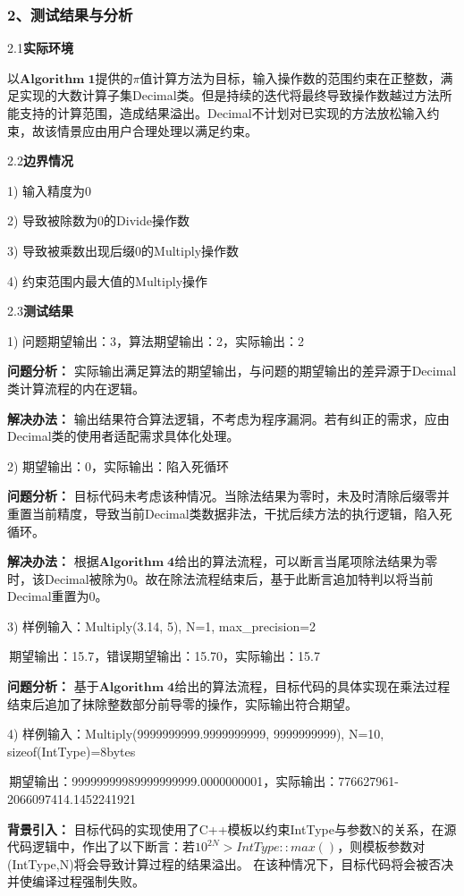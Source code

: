 \documentclass[UTF8, a4paper]{ctexart}
\begin{document}
\subsubsection*{2、测试结果与分析}
2.1\;\textbf{实际环境} \par
以$\mathbf{Algorithm\;1}$提供的$\pi$值计算方法为目标，输入操作数的范围约束在正整数，满足实现的大数计算子集Decimal类。但是持续的迭代将最终导致操作数越过方法所能支持的计算范围，造成结果溢出。Decimal不计划对已实现的方法放松输入约束，故该情景应由用户合理处理以满足约束。\par
2.2\;\textbf{边界情况} \par
1) 输入精度为0 \par
2) 导致被除数为0的Divide操作数 \par
3) 导致被乘数出现后缀0的Multiply操作数 \par
4) 约束范围内最大值的Multiply操作 \par
2.3\;\textbf{测试结果} \par
1) 问题期望输出：3，算法期望输出：2，实际输出：2 \par
\textbf{问题分析：} 实际输出满足算法的期望输出，与问题的期望输出的差异源于Decimal类计算流程的内在逻辑。 \par
\textbf{解决办法：} 输出结果符合算法逻辑，不考虑为程序漏洞。若有纠正的需求，应由Decimal类的使用者适配需求具体化处理。 \par
2) 期望输出：0，实际输出：陷入死循环 \par
\textbf{问题分析：} 目标代码未考虑该种情况。当除法结果为零时，未及时清除后缀零并重置当前精度，导致当前Decimal类数据非法，干扰后续方法的执行逻辑，陷入死循环。 \par
\textbf{解决办法：} 根据$\mathbf{Algorithm\;4}$给出的算法流程，可以断言当尾项除法结果为零时，该Decimal被除为0。故在除法流程结束后，基于此断言追加特判以将当前Decimal重置为0。 \par
3) 样例输入：Multiply(3.14, 5), N=1, max\_precision=2 \par
\;\;\;\;\,期望输出：15.7，错误期望输出：15.70，实际输出：15.7
\par
\textbf{问题分析：} 基于$\mathbf{Algorithm\;4}$给出的算法流程，目标代码的具体实现在乘法过程结束后追加了抹除整数部分前导零的操作，实际输出符合期望。 \par
4) 样例输入：Multiply(9999999999.9999999999, 9999999999), N=10, sizeof(IntType)=8bytes \par
\;\;\;\;\,期望输出：99999999989999999999.0000000001，实际输出：776627961-2066097414.1452241921 \par
\textbf{背景引入：} 目标代码的实现使用了C++模板以约束IntType与参数N的关系，在源代码逻辑中，作出了以下断言：若$10^{2N}>IntType::max()$，则模板参数对(IntType,N)将会导致计算过程的结果溢出。 在该种情况下，目标代码将会被否决并使编译过程强制失败。\par
\end{document}
